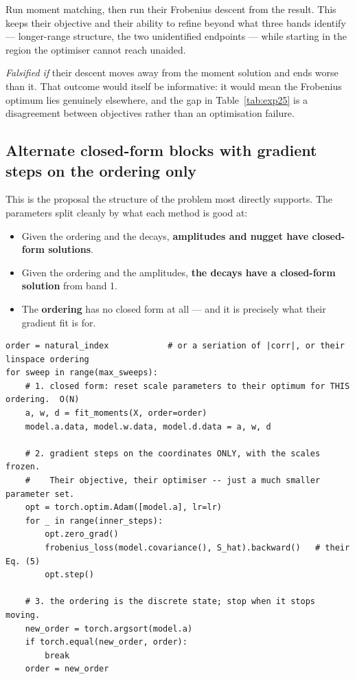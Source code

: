 \documentclass[11pt,a4paper]{article}
\begin{document}
Run moment matching, then run their Frobenius descent from the result. This keeps their
objective and their ability to refine beyond what three bands identify --- longer-range
structure, the two unidentified endpoints --- while starting in the region the optimiser cannot
reach unaided.

\emph{Falsified if} their descent moves away from the moment solution and ends worse than it.
That outcome would itself be informative: it would mean the Frobenius optimum lies genuinely
elsewhere, and the gap in Table~\ref{tab:exp25} is a disagreement between objectives rather
than an optimisation failure.

\subsection{Alternate closed-form blocks with gradient steps on the ordering only}
\label{sec:alternate}

This is the proposal the structure of the problem most directly supports. The parameters split
cleanly by what each method is good at:
\begin{itemize}
  \item Given the ordering and the decays, \textbf{amplitudes and nugget have closed-form
        solutions}.
  \item Given the ordering and the amplitudes, \textbf{the decays have a closed-form solution}
        from band 1.
  \item The \textbf{ordering} has no closed form at all --- and it is precisely what their
        gradient fit is for.
\end{itemize}

\begin{lstlisting}[style=py,caption={Alternating scheme: closed form for scale, gradients for order.},label={lst:alt},float=htbp]
order = natural_index            # or a seriation of |corr|, or their linspace ordering
for sweep in range(max_sweeps):
    # 1. closed form: reset scale parameters to their optimum for THIS ordering.  O(N)
    a, w, d = fit_moments(X, order=order)
    model.a.data, model.w.data, model.d.data = a, w, d

    # 2. gradient steps on the coordinates ONLY, with the scales frozen.
    #    Their objective, their optimiser -- just a much smaller parameter set.
    opt = torch.optim.Adam([model.a], lr=lr)
    for _ in range(inner_steps):
        opt.zero_grad()
        frobenius_loss(model.covariance(), S_hat).backward()   # their Eq. (5)
        opt.step()

    # 3. the ordering is the discrete state; stop when it stops moving.
    new_order = torch.argsort(model.a)
    if torch.equal(new_order, order):
        break
    order = new_order
\end{lstlisting}
\end{document}
